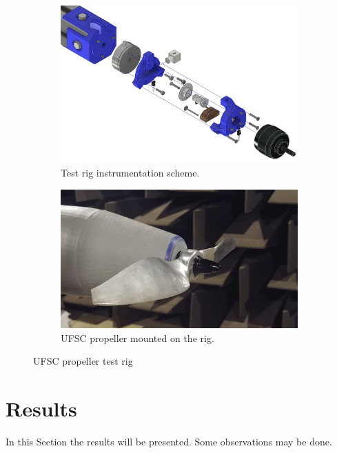 \documentclass[10pt,fleqn,a4paper,twoside]{article}
\begin{document}
\begin{figure}[H]
    \centering
    \begin{subfigure}{0.4\textwidth}
        \includegraphics[width=\textwidth]{Figures/instrumentation_testrig.jpg}
        \caption{Test rig instrumentation scheme.}
        \label{fig:second}
    \end{subfigure}
    \hfill
    \centering
    \begin{subfigure}{0.4\textwidth}
        \includegraphics[width=\textwidth]{Figures/mounted_propeller.jpg}
        \caption{UFSC propeller mounted on the rig.}
        \label{fig:fourth}
    \end{subfigure}
    \caption{UFSC propeller test rig}
    \label{fig:figures}
    \end{figure}

\section{Results}
In this Section the results will be presented. Some observations may be done.
\end{document}

